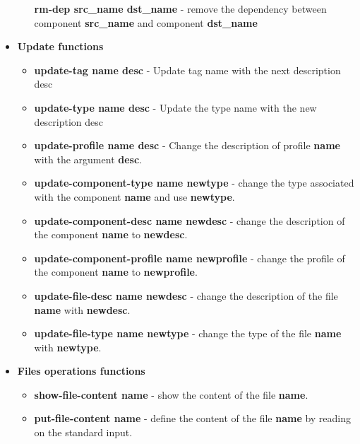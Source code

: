 \documentclass[11pt]{book}
\begin{document}
\begin{itemize}
\begin{itemize}
            \textbf{rm-dep src\_name dst\_name} - remove the dependency between
                                    component \textbf{src\_name} and component \textbf{dst\_name}
      \end{itemize}
   \item
      \textbf{Update functions}
      \begin{itemize}
         \item
            \textbf{update-tag name desc} - Update tag name with the next description desc
         \item
            \textbf{update-type name desc} - Update the type name with the new description desc
         \item
            \textbf{update-profile name desc} - Change the description of
            profile \textbf{name} with the argument \textbf{desc}.
         \item
            \textbf{update-component-type name newtype} - change the type
            associated with the component \textbf{name} and use
            \textbf{newtype}.
         \item
            \textbf{update-component-desc name newdesc} - change the description
            of the component \textbf{name} to \textbf{newdesc}.
         \item
            \textbf{update-component-profile name newprofile} - change the
            profile of the component \textbf{name} to \textbf{newprofile}.
         \item
            \textbf{update-file-desc name newdesc} - change the description of
            the file \textbf{name} with \textbf{newdesc}.
         \item
            \textbf{update-file-type name newtype} - change the type of the file
            \textbf{name} with \textbf{newtype}.
      \end{itemize}

   \item
      \textbf{Files operations functions}
      \begin{itemize}
         \item
            \textbf{show-file-content name} - show the content of the file
            \textbf{name}.
         \item
            \textbf{put-file-content name} - define the content of the file \textbf{name} by reading
            on the standard input.
      \end{itemize}
\end{itemize}
\end{document}
